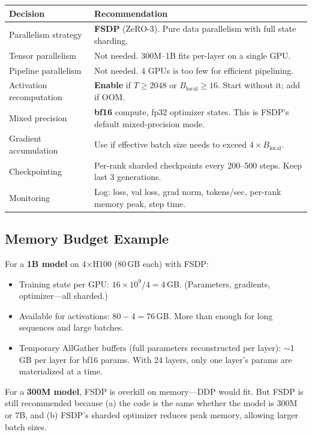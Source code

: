 \begin{center}
\begin{tabularx}{\textwidth}{@{}lX@{}}
\toprule
\textbf{Decision} & \textbf{Recommendation} \\
\midrule
Parallelism strategy & \textbf{FSDP} (ZeRO-3). Pure data parallelism with full state sharding. \\
Tensor parallelism & Not needed. 300M--1B fits per-layer on a single GPU. \\
Pipeline parallelism & Not needed. 4 GPUs is too few for efficient pipelining. \\
Activation recomputation & \textbf{Enable} if $T \geq 2048$ or $B_{\text{local}} \geq 16$. Start without it; add if OOM. \\
Mixed precision & \textbf{bf16} compute, fp32 optimizer states. This is FSDP's default mixed-precision mode. \\
Gradient accumulation & Use if effective batch size needs to exceed $4 \times B_{\text{local}}$. \\
Checkpointing & Per-rank sharded checkpoints every 200--500 steps. Keep last 3 generations. \\
Monitoring & Log: loss, val loss, grad norm, tokens/sec, per-rank memory peak, step time. \\
\bottomrule
\end{tabularx}
\end{center}

\subsection{Memory Budget Example}

For a \textbf{1B model} on 4$\times$H100 (80\,GB each) with FSDP:

\begin{itemize}[nosep]
  \item Training state per GPU: $16 \times 10^9 / 4 = 4$\,GB. (Parameters, gradients, optimizer---all sharded.)
  \item Available for activations: $80 - 4 = 76$\,GB. More than enough for long sequences and large batches.
  \item Temporary AllGather buffers (full parameters reconstructed per layer): $\sim$1\,GB per layer for bf16 params. With 24 layers, only one layer's params are materialized at a time.
\end{itemize}

For a \textbf{300M model}, FSDP is overkill on memory---DDP would fit. But FSDP is still recommended because (a) the code is the same whether the model is 300M or 7B, and (b) FSDP's sharded optimizer reduces peak memory, allowing larger batch sizes.

